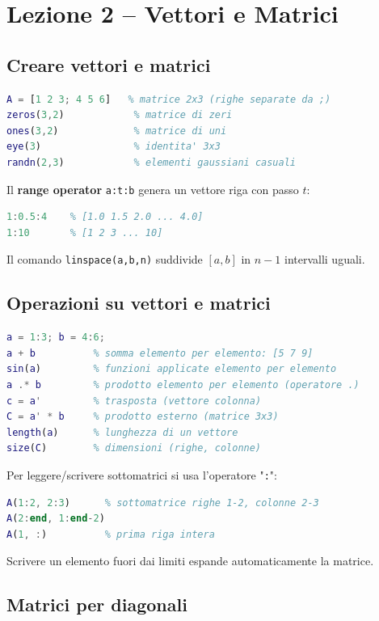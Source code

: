\documentclass[12pt,a4paper,]{report}
\begin{document}
\section{Lezione 2 -- Vettori e Matrici}

\subsection{Creare vettori e matrici}

\begin{lstlisting}[language=Matlab]
A = [1 2 3; 4 5 6]   % matrice 2x3 (righe separate da ;)
zeros(3,2)            % matrice di zeri
ones(3,2)             % matrice di uni
eye(3)                % identita' 3x3
randn(2,3)            % elementi gaussiani casuali
\end{lstlisting}
Il \textbf{range operator} \texttt{a:t:b} genera un vettore riga con passo $t$:
\begin{lstlisting}[language=Matlab]
1:0.5:4    % [1.0 1.5 2.0 ... 4.0]
1:10       % [1 2 3 ... 10]
\end{lstlisting}
Il comando \texttt{linspace(a,b,n)} suddivide $[a,b]$ in $n-1$ intervalli uguali.

\subsection{Operazioni su vettori e matrici}

\begin{lstlisting}[language=Matlab]
a = 1:3; b = 4:6;
a + b          % somma elemento per elemento: [5 7 9]
sin(a)         % funzioni applicate elemento per elemento
a .* b         % prodotto elemento per elemento (operatore .)
c = a'         % trasposta (vettore colonna)
C = a' * b     % prodotto esterno (matrice 3x3)
length(a)      % lunghezza di un vettore
size(C)        % dimensioni (righe, colonne)
\end{lstlisting}
Per leggere/scrivere sottomatrici si usa l'operatore "\texttt{:}":
\begin{lstlisting}[language=Matlab]
A(1:2, 2:3)      % sottomatrice righe 1-2, colonne 2-3
A(2:end, 1:end-2)
A(1, :)          % prima riga intera
\end{lstlisting}
Scrivere un elemento fuori dai limiti espande automaticamente la matrice.

\subsection{Matrici per diagonali}
\end{document}
